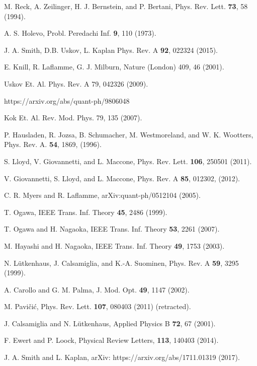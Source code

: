 \documentclass[aps,pra,twocolumn,showpacs,superscriptaddress,floatfix,10pt]{revtex4}
\begin{document}
\begin{thebibliography}{99}

 M. Reck, A. Zeilinger, H. J. Bernstein, and P. Bertani, Phys. Rev. Lett. {\bf 73}, 58 (1994).

 A. S. Holevo, Probl. Peredachi Inf. \textbf{9}, 110 (1973).	

 J. A. Smith, D.B. Uskov, L. Kaplan Phys. Rev. A \textbf{92}, 022324 (2015).

  E. Knill, R. Laflamme, G. J. Milburn, Nature (London) 409, 46 (2001).

 Uskov Et. Al.
Phys. Rev. A 79, 042326 (2009).

 https://arxiv.org/abs/quant-ph/9806048

 Kok Et. Al.
Rev. Mod. Phys. 79, 135 (2007).

 P. Hausladen, R. Jozsa, B. Schumacher, M. Westmoreland, and W. K. Wootters, Phys. Rev. A. \textbf{54}, 1869, (1996).

 S. Lloyd, V. Giovannetti, and L. Maccone, Phys. Rev. Lett. \textbf{106}, 250501 (2011).

 V. Giovannetti, S. Lloyd, and L. Maccone, Phys. Rev. A \textbf{85}, 012302, (2012).

 C. R. Myers and R. Laflamme, arXiv:quant-ph/0512104 (2005).

 T. Ogawa, IEEE Trans. Inf. Theory \textbf{45}, 2486 (1999).

 T. Ogawa and H. Nagaoka, IEEE Trans. Inf. Theory \textbf{53}, 2261 (2007).

 M. Hayashi and H. Nagaoka, IEEE Trans. Inf. Theory \textbf{49}, 1753 (2003).

 N. L\"utkenhaus, J. Calsamiglia, and K.-A. Suominen, Phys. Rev. A {\bf 59}, 3295 (1999).

 A. Carollo and G. M. Palma, J. Mod. Opt. {\bf 49}, 1147 (2002).

 M. Pavi\v{c}i\'c, Phys. Rev. Lett. {\bf 107}, 080403 (2011) (retracted).

 J. Calsamiglia and N. L\"utkenhaus, Applied Physics B {\bf 72}, 67 (2001).

 F. Ewert and P. Loock, Physical Review Letters, {\bf 113}, 140403 (2014).

 J. A. Smith and L. Kaplan, arXiv: https://arxiv.org/abs/1711.01319 (2017).

\end{thebibliography}
\end{document}
